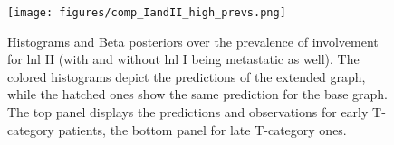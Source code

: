 \documentclass[twocolumn]{aastex631}
\begin{document}
\begin{figure}
    \begin{centering}
        \texttt{[image: figures/comp\_IandII\_high\_prevs.png]}
        \caption{Histograms and Beta posteriors over the prevalence of involvement for \gls{lnl} II (with and without \gls{lnl} I being metastatic as well). The colored histograms depict the predictions of the extended graph, while the hatched ones show the same prediction for the base graph. The top panel displays the predictions and observations for early T-category patients, the bottom panel for late T-category ones.}
        \label{fig:IandII_high_prevs}
    \end{centering}
\end{figure}

\begin{table*}
    \centering
    \caption{Model comparison results from the base graph and the extended graph we chose as the ``winnning'' model. For both \glspl{dag} we show the log-evidence, computed via thermodynamic integration, the negative one half of the \gls{bic}, as well as the maximum log-likelihood that was encountered during the final \gls{mcmc} sampling round.}
    \label{table:evidence}
\end{table*}


\end{document}
